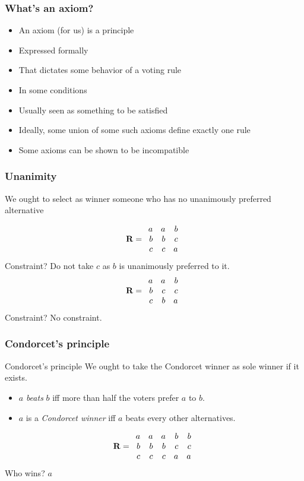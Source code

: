 \documentclass[french,english]{beamer}
\begin{document}
\begin{frame}
	\frametitle{What’s an axiom?}
	\begin{itemize}
		\item An axiom (for us) is a principle
		\item Expressed formally
		\item That dictates some behavior of a voting rule
		\item In some conditions
		\item Usually seen as something to be satisfied
		\item Ideally, some union of some such axioms define exactly one rule
		\item Some axioms can be shown to be incompatible
	\end{itemize}
\end{frame}

\begin{frame}
	\frametitle{Unanimity}
	\begin{definition}[Unanimity]
		We ought to select as winner someone who has no unanimously preferred alternative
	\end{definition}
	\begin{equation}
		\mathbf{R} =
		\begin{array}{rrr}
			a	&	a	&	b\\
			b	&	b	&	c\\
			c	&	c	&	a
		\end{array}
	\end{equation}
	Constraint? \pause Do not take $c$ as $b$ is unanimously preferred to it.	\pause
	\begin{equation}
		\mathbf{R} =
		\begin{array}{rrr}
			a	&	a	&	b\\
			b	&	c	&	c\\
			c	&	b	&	a
		\end{array}
	\end{equation}
	Constraint? \pause No constraint.
\end{frame}

\begin{frame}
	\frametitle{Condorcet’s principle}
	\begin{block}{Condorcet’s principle}
		We ought to take the Condorcet winner as sole winner if it exists.
		\begin{itemize}
			\item $a$ \emph{beats} $b$ iff more than half the voters prefer $a$ to $b$.
			\item $a$ is a \emph{Condorcet winner} iff $a$ beats every other alternatives.
		\end{itemize}
	\end{block}
	\vfill
	\begin{equation}
		\mathbf{R} =
		\begin{array}{rrrrr}
			a	&	a	&	a	&	b	&	b\\
			b	&	b	&	b	&	c	&	c\\
			c	&	c	&	c	&	a	&	a
		\end{array}
	\end{equation}
	 Who wins? \pause $a$
\end{frame}
\end{document}
